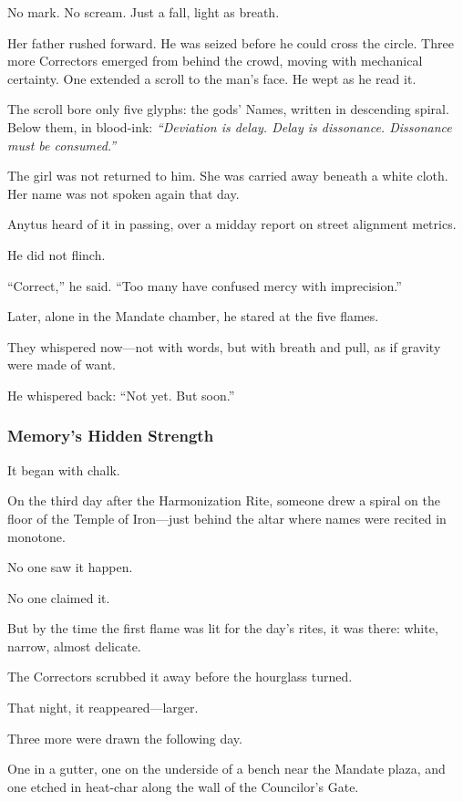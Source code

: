 \documentclass[12pt]{article}
\begin{document}
No mark. No scream. Just a fall, light as breath.

Her father rushed forward. He was seized before he could cross the circle. Three more Correctors emerged from behind the crowd, moving with mechanical certainty. One extended a scroll to the man’s face. He wept as he read it.

The scroll bore only five glyphs: the gods’ Names, written in descending spiral. Below them, in blood-ink: \textit{“Deviation is delay. Delay is dissonance. Dissonance must be consumed.”}

The girl was not returned to him. She was carried away beneath a white cloth. Her name was not spoken again that day.

Anytus heard of it in passing, over a midday report on street alignment metrics. 

He did not flinch. 

“Correct,” he said. “Too many have confused mercy with imprecision.”

Later, alone in the Mandate chamber, he stared at the five flames.

They whispered now—not with words, but with breath and pull, as if gravity were made of want.

He whispered back: “Not yet. But soon.”

\dotfill

\subsubsection*{Memory's Hidden Strength}

It began with chalk.

On the third day after the Harmonization Rite, someone drew a spiral on the floor of the Temple of Iron—just behind the altar where names were recited in monotone. 

No one saw it happen. 

No one claimed it. 

But by the time the first flame was lit for the day’s rites, it was there: white, narrow, almost delicate.

The Correctors scrubbed it away before the hourglass turned.

That night, it reappeared—larger.

Three more were drawn the following day. 

One in a gutter, one on the underside of a bench near the Mandate plaza, and one etched in heat-char along the wall of the Councilor’s Gate. 
\end{document}
